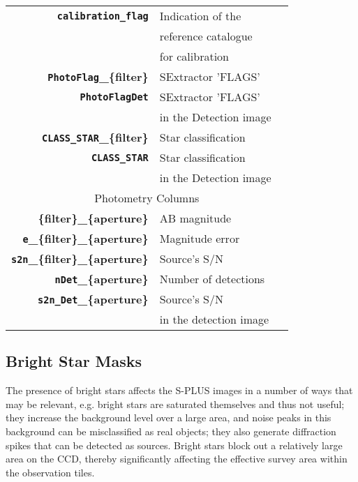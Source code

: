 \documentclass[fleqn,usenatbib]{mnras}
\begin{document}
\begin{table}
\begin{tabular}{rll}
\textbf{\texttt{calibration\_flag}}       & Indication of the       & \\
                                          & reference catalogue       & \\
                                          & for calibration         & \\
\textbf{\texttt{PhotoFlag}\_\{filter\}}   & SExtractor 'FLAGS'      & \\
\textbf{\texttt{PhotoFlagDet}}            & SExtractor 'FLAGS'      & \\
                                          & in the  Detection image & \\
\textbf{\texttt{CLASS\_STAR}\_\{filter\}} & Star classification     & \\
\textbf{\texttt{CLASS\_STAR}}             & Star classification     & \\
                                          & in the Detection image  & \\
\hline \hline

\multicolumn{3}{c}{Photometry Columns} \\ \hline

\textbf{\{filter\}\_\{aperture\}}               & AB magnitude            & \\
\textbf{\texttt{e}\_\{filter\}\_\{aperture\}}   & Magnitude error         & \\
\textbf{\texttt{s2n}\_\{filter\}\_\{aperture\}} & Source's S/N            & \\
\textbf{\texttt{nDet}\_\{aperture\}}            & Number of detections    & \\
\textbf{\texttt{s2n\_Det}\_\{aperture\}}        & Source's S/N            & \\ 
                                                & in the detection image  & \\

\end{tabular}
\end{table}

\subsection{Bright Star Masks}
The presence of bright stars affects the S-PLUS images in a number of ways that may be relevant, e.g. bright stars are saturated themselves and thus not useful; they increase the background level over a large area, and noise peaks in this background can be misclassified as real objects; they also generate diffraction spikes that can be detected as sources. Bright stars block out a relatively large area on the CCD, thereby significantly affecting the effective survey area within the observation tiles.
\end{document}
